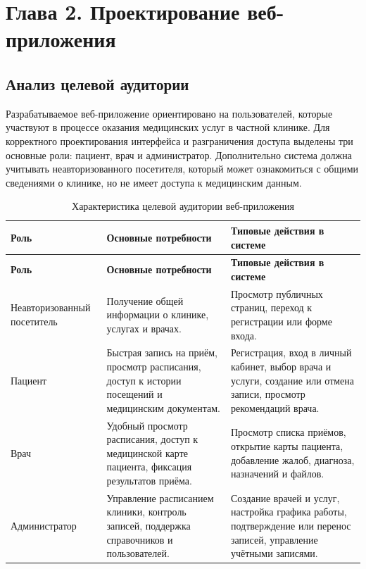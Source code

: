 
\section*{Глава 2. Проектирование веб-приложения}

\subsection{Анализ целевой аудитории}

Разрабатываемое веб-приложение ориентировано на пользователей, которые участвуют в процессе оказания медицинских услуг в частной клинике. Для корректного проектирования интерфейса и разграничения доступа выделены три основные роли: пациент, врач и администратор. Дополнительно система должна учитывать неавторизованного посетителя, который может ознакомиться с общими сведениями о клинике, но не имеет доступа к медицинским данным.

{\small
\setlength{\tabcolsep}{4pt}
\renewcommand{\arraystretch}{1.12}
\begin{longtable}{|>{\raggedright\arraybackslash}p{}|>{\raggedright\arraybackslash}p{}|>{\raggedright\arraybackslash}p{}|}
\caption{Характеристика целевой аудитории веб-приложения}\label{tab:audience}\\
\hline
\textbf{Роль} & \textbf{Основные потребности} & \textbf{Типовые действия в системе} \\ \hline
\endfirsthead
\tabcont{\ref{tab:audience}}
\textbf{Роль} & \textbf{Основные потребности} & \textbf{Типовые действия в системе} \\ \hline
\endhead
Неавторизованный посетитель & Получение общей информации о клинике, услугах и врачах. & Просмотр публичных страниц, переход к регистрации или форме входа. \\ \hline
Пациент & Быстрая запись на приём, просмотр расписания, доступ к истории посещений и медицинским документам. & Регистрация, вход в личный кабинет, выбор врача и услуги, создание или отмена записи, просмотр рекомендаций врача. \\ \hline
Врач & Удобный просмотр расписания, доступ к медицинской карте пациента, фиксация результатов приёма. & Просмотр списка приёмов, открытие карты пациента, добавление жалоб, диагноза, назначений и файлов. \\ \hline
Администратор & Управление расписанием клиники, контроль записей, поддержка справочников и пользователей. & Создание врачей и услуг, настройка графика работы, подтверждение или перенос записей, управление учётными записями. \\ \hline
\end{longtable}
}

